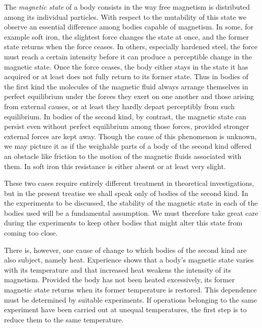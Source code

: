 The \textit{magnetic state} of a body consists in the way free magnetism is distributed among its individual particles. With respect to the mutability of this state we observe an essential difference among bodies capable of magnetism. In some, for example soft iron, the slightest force changes the state at once, and the former state returns when the force ceases. In others, especially hardened steel, the force must reach a certain intensity before it can produce a perceptible change in the magnetic state. Once the force ceases, the body either stays in the state it has acquired or at least does not fully return to its former state. Thus in bodies of the first kind the molecules of the magnetic fluid always arrange themselves in perfect equilibrium under the forces they exert on one another and those arising from external causes, or at least they hardly depart perceptibly from such equilibrium. In bodies of the second kind, by contrast, the magnetic state can persist even without perfect equilibrium among those forces, provided stronger external forces are kept away. Though the cause of this phenomenon is unknown, we may picture it as if the weighable parts of a body of the second kind offered an obstacle like friction to the motion of the magnetic fluids associated with them. In soft iron this resistance is either absent or at least very slight.

These two cases require entirely different treatment in theoretical investigations, but in the present treatise we shall speak only of bodies of the second kind. In the experiments to be discussed, the stability of the magnetic state in each of the bodies used will be a fundamental assumption. We must therefore take great care during the experiments to keep other bodies that might alter this state from coming too close.

There is, however, one cause of change to which bodies of the second kind are also subject, namely heat. Experience shows that a body's magnetic state varies with its temperature and that increased heat weakens the intensity of its magnetism. Provided the body has not been heated excessively, its former magnetic state returns when its former temperature is restored. This dependence must be determined by suitable experiments. If operations belonging to the same experiment have been carried out at unequal temperatures, the first step is to reduce them to the same temperature.
